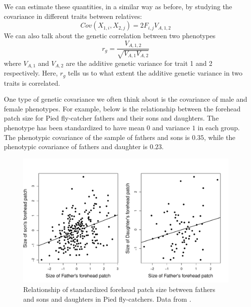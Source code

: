 We can estimate these quantities, in a similar way as before, by
studying the covariance in different traits between relatives: 
\begin{equation}
Cov(X_{1,i},X_{2,j}) = 2 F_{i,j} V_{A,1,2}
\end{equation}
We can also talk about the genetic correlation between two phenotypes
\begin{equation}
r_g = \frac{V_{A,1,2}}{\sqrt{V_{A,1}V_{A,2}}}
\end{equation}
where $V_{A,1}$ and $V_{A,2}$ are the additive genetic variance for trait 1 and 2 respectively. Here, $r_g$ tells us to what extent the additive genetic variance in two traits is correlated.   

One  type of  genetic covariance we often think about is the covariance of male and female phenotypes. For example, below is the relationship between the forehead patch size for Pied fly-catcher fathers and their sons and daughters. The phenotype has been standardized to have mean $0$  and variance $1$ in each group. The phenotypic covariance of the sample of fathers and sons is $0.35$, while the phenotypic covariance of fathers and daughter is $0.23$. 


\begin{figure}
\begin{center}
\includegraphics[width= \textwidth]{Journal_figs/Quant_gen/pied_fly_catcher_sex_genetic_corr/FlyCatcher_genetic_corr.pdf}
\end{center}
\caption{Relationship of standardized forehead patch size between
  fathers and sons and daughters in  Pied fly-catchers. Data from
  \citeauthor{potti:11}. } \label{fig:FlyCatcher_genetic_corr}   %
\end{figure}

